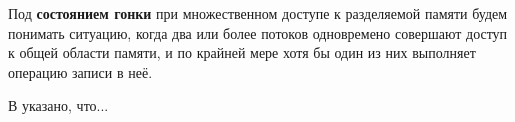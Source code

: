 \Introduction

Под \textbf{состоянием гонки} при множественном доступе к разделяемой памяти будем понимать ситуацию, когда два или более потоков одновремено совершают доступ к общей области памяти, и по крайней мере хотя бы один из них выполняет операцию записи в неё. 





В \cite{static-data-race-analysis-for-c} указано, что...
